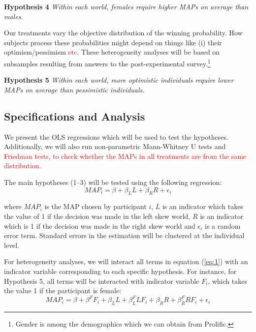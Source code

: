 \noindent \textbf{Hypothesis 4} \quad \textit{Within each world, females require higher MAPs on average than males.}

Our treatments vary the objective distribution of the winning probability.
How subjects process these probabilities might depend on things like (i) their optimism/pessimism \textcolor{red}{etc}.
These heterogeneity analyses will be based on subsamples resulting from answers to the post-experimental survey.\footnote{
Gender is among the demographics which we can obtain from Prolific.
}

\noindent \textbf{Hypothesis 5} \quad \textit{Within each world, more optimistic individuals require lower MAPs on average than pessimistic individuals.}




\subsection{Specifications and Analysis}
We present the OLS regressions which will be used to test the hypotheses.
Additionally, we will also run non-parametric Mann-Whitney U tests and \textcolor{red}{Friedman tests, to check whether the MAPs in all treatments are from the same distribution.}

The main hypotheses (1--3) will be tested using the following regression:
\begin{equation} \label{eq:1}
MAP_i = \beta + \beta_L L + \beta_R R + \epsilon_i
\end{equation}

\noindent where $MAP_i$ is the MAP chosen by participant $i$, $L$ is an indicator which takes the value of 1 if the decision was made in the left skew world, $R$ is an indicator which is 1 if the decision was made in the right skew world and $\epsilon_i$ is a random error term.
Standard errors in the estimation will be clustered at the individual level.

For heterogeneity analyses, we will interact all terms in equation (\ref{eq:1}) with an indicator variable corresponding to each specific hypothesis.
For instance, for Hypothesis 5, all terms will be interacted with indicator variable $F_i$, which takes the value 1 if the participant is female:
\begin{equation} \label{eq:2}
MAP_i = \beta + \beta^F F_i + \beta_L L + \beta_L^F L F_i + \beta_R R + \beta_R^F R F_i + \epsilon_i
\end{equation}

